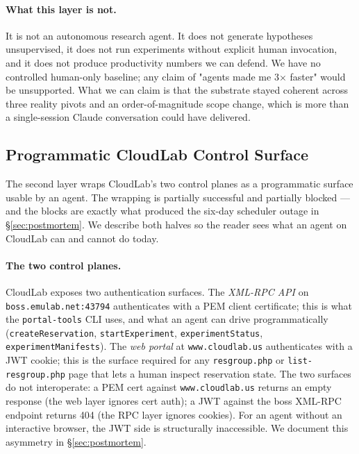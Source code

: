 \documentclass[11pt,a4paper]{article}
\begin{document}
\paragraph{What this layer is not.} It is not an autonomous research agent. It does not generate hypotheses unsupervised, it does not run experiments without explicit human invocation, and it does not produce productivity numbers we can defend. We have no controlled human-only baseline; any claim of "agents made me 3$\times$ faster" would be unsupported. What we can claim is that the substrate stayed coherent across three reality pivots and an order-of-magnitude scope change, which is more than a single-session Claude conversation could have delivered.

\subsection{Programmatic CloudLab Control Surface}
\label{sec:approach:cloudlab}

The second layer wraps CloudLab's two control planes as a programmatic surface usable by an agent. The wrapping is partially successful and partially blocked --- and the blocks are exactly what produced the six-day scheduler outage in §\ref{sec:postmortem}. We describe both halves so the reader sees what an agent on CloudLab can and cannot do today.

\paragraph{The two control planes.} CloudLab exposes two authentication surfaces. The \emph{XML-RPC API} on \texttt{boss.emulab.net:43794} authenticates with a PEM client certificate; this is what the \texttt{portal-tools} CLI uses, and what an agent can drive programmatically (\texttt{createReservation}, \texttt{startExperiment}, \texttt{experimentStatus}, \texttt{experimentManifests}). The \emph{web portal} at \texttt{www.cloudlab.us} authenticates with a JWT cookie; this is the surface required for any \texttt{resgroup.php} or \texttt{list-resgroup.php} page that lets a human inspect reservation state. The two surfaces do not interoperate: a PEM cert against \texttt{www.cloudlab.us} returns an empty response (the web layer ignores cert auth); a JWT against the boss XML-RPC endpoint returns 404 (the RPC layer ignores cookies). For an agent without an interactive browser, the JWT side is structurally inaccessible. We document this asymmetry in §\ref{sec:postmortem}.
\end{document}
